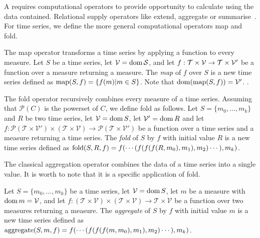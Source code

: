 A  requires computational operators to provide opportunity
to calculate using the data contained. Relational  supply
operators like extend, aggregate or
summarise~\cite{date:introduction}. For time series, we define the more
general computational operators map and fold.

The map operator transforms a time series by applying a function to
every measure.  Let $S$ be a time series, let $\cal{V}=\operatorname{dom} S$, and
let $f:\cal{T}\times\cal{V}\rightarrow\cal{T}\times\cal{V'}$ be a
function over a measure returning a measure. The \emph{map} of $f$
over $S$ is a new time series defined as $\operatorname*{map}(S,f)=\{f(m)|m\in
S\}$. Note that $\operatorname{dom}(\operatorname*{map}(S,f))=\cal{V'}$.
%
.

The fold operator recursively combines every measure of a time
series. Assuming that $\mathcal{P}(C)$ is the powerset of $C$, we
define fold as follows.
%
Let $S=\{m_0,\dots, m_k\}$ and $R$ be two time series, let
$\mathcal{V}=\operatorname{dom} S$, let $\mathcal{V'}=\operatorname{dom} R$ and let 
%
$f:\mathcal{P}(\mathcal{T}\times\mathcal{V'}) \times (\mathcal{T}\times\mathcal{V}) \rightarrow \mathcal{P}(\mathcal{T}\times\mathcal{V'})$ 
%
be a function over a time series and a measure returning a time
series.
%
The \emph{fold} of $S$ by $f$ with initial value $R$ is a new time
series defined as $\operatorname*{fold}(S,R,f) = f(\cdots(f(f(f(R,m_0),\allowbreak
m_1),\allowbreak m_2)\cdots),\allowbreak m_k)$.
%


The classical aggregation operator combines the data of a time series
into a single value.  It is worth to note that it is a specific
application of fold.

Let $S=\{m_0,\dots,m_k\}$ be a time series, let $\mathcal{V}=\operatorname{dom} S$,
let $m$ be a measure with $\operatorname{dom} m=\mathcal{V}$, and let 
%
$f:(\mathcal{T}\times\mathcal{V})\times(\mathcal{T}\times\mathcal{V})\rightarrow \mathcal{T}\times\mathcal{V}$ 
%
be a function over two measures returning a measure. The
\emph{aggregate} of $S$ by $f$ with initial value $m$ is a new time
series defined as $\operatorname*{aggregate}(S,m,f) = f(\cdots(f(f(f(m,m_0),\allowbreak
m_1),\allowbreak m_2)\cdots),\allowbreak m_k)$.  


